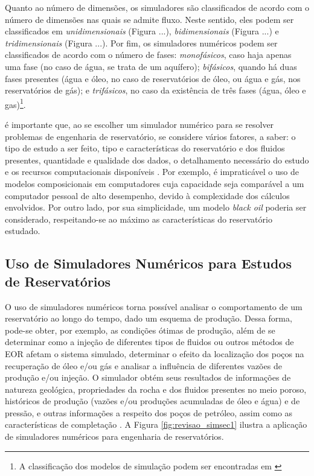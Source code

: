 Quanto ao n\'{u}mero de dimens\~{o}es, os simuladores s\~{a}o classificados de acordo com o n\'{u}mero de dimens\~{o}es nas quais se admite fluxo. Neste sentido, eles podem ser classificados em \textit{unidimensionais} (Figura ...), \textit{bidimensionais} (Figura ...) e \textit{tridimensionais} (Figura ...). Por fim, os simuladores num\'{e}ricos podem ser classificados de acordo com o n\'{u}mero de fases: \textit{monof\'{a}sicos}, caso haja apenas uma fase (no caso de \'{a}gua, se trata de um aqu\'{i}fero); \textit{bif\'{a}sicos}, quando h\'{a} duas fases presentes (\'{a}gua e \'{o}leo, no caso de reservat\'{o}rios de \'{o}leo, ou \'{a}gua e g\'{a}s, nos reservat\'{o}rios de g\'{a}s); e \textit{trif\'{a}sicos}, no caso da exist\^{e}ncia de tr\^{e}s fases (\'{a}gua, \'{o}leo e gas)\footnote{A classifica\c{c}\~{a}o dos modelos de simula\c{c}\~{a}o podem ser encontradas em \cite[pp. 517--519]{engres}}.


\'{e} importante que, ao se escolher um simulador num\'{e}rico para se resolver problemas de engenharia de reservat\'{o}rio, se considere v\'{a}rios fatores, a saber: o tipo de estudo a ser feito, tipo e caracter\'{i}sticas do reservat\'{o}rio e dos fluidos presentes, quantidade e qualidade dos dados, o detalhamento necess\'{a}rio do estudo e os recursos computacionais dispon\'{i}veis \cite[p. 519]{engres}. Por exemplo, \'{e} impratic\'{a}vel o uso de modelos composicionais em computadores cuja capacidade seja compar\'{a}vel a um computador pessoal de alto desempenho, devido \`{a} complexidade dos c\'{a}lculos envolvidos. Por outro lado, por sua simplicidade, um modelo \textit{black oil} poderia ser considerado, respeitando-se ao m\'{a}ximo as caracter\'{i}sticas do reservat\'{o}rio estudado.

\subsection{Uso de Simuladores Num\'{e}ricos para Estudos de Reservat\'{o}rios}

O uso de simuladores num\'{e}ricos torna poss\'{i}vel analisar o comportamento de um reservat\'{o}rio ao longo do tempo, dado um esquema de produ\c{c}\~{a}o. Dessa forma, pode-se obter, por exemplo, as condi\c{c}\~{o}es \'{o}timas de produ\c{c}\~{a}o, al\'{e}m de se determinar como a inje\c{c}\~{a}o de diferentes tipos de fluidos ou outros m\'{e}todos de EOR afetam o sistema simulado, determinar o efeito da localiza\c{c}\~{a}o dos po\c{c}os na recupera\c{c}\~{a}o de \'{o}leo e/ou g\'{a}s e analisar a influ\^{e}ncia de diferentes vaz\~{o}es de produ\c{c}\~{a}o e/ou inje\c{c}\~{a}o. O simulador obt\'{e}m seus resultados de informa\c{c}\~{o}es de natureza geol\'{o}gica, propriedades da rocha e dos fluidos presentes no meio poroso, hist\'{o}ricos de produ\c{c}\~{a}o (vaz\~{o}es e/ou produ\c{c}\~{o}es acumuladas de \'{o}leo e \'{a}gua) e de press\~{a}o, e outras informa\c{c}\~{o}es a respeito dos po\c{c}os de petr\'{o}leo, assim como as caracter\'{i}sticas de completa\c{c}\~{a}o \cite[pp. 522--523]{engres}. A Figura \ref{fig:revisao_simsec1} ilustra a aplica\c{c}\~{a}o de simuladores num\'{e}ricos para engenharia de reservat\'{o}rios.

